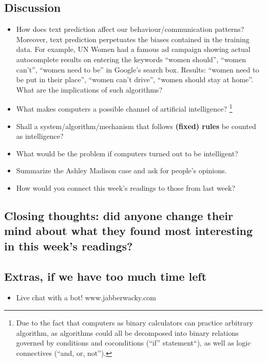 \documentclass[12pt]{article}
\theoremstyle{definition}
\theoremstyle{plain}
\begin{document}
\subsection{Discussion}
\begin{itemize}
    \item How does text prediction affect our behaviour/communication patterns? 
    Moreover, text prediction perpetuates the biases contained in the training data. For example, UN Women had a famous ad campaign showing actual autocomplete results on entering the keywords ``women should'', ``women can't'', ``women need to be'' in Google's search box. Results: ``women need to be put in their place'', ``women can't drive'', ``women should stay at home''.
    What are the implications of such algorithms?

    \item What makes computers a possible channel of artificial
        intelligence?
        \footnote{Due to the fact that computers as binary calculators can
            practice arbitrary algorithm, as algorithms could all be decomposed
            into binary relations governed by conditions and coconditions
            (``if'' statement``), as well as logic connectives (``and, or,
            not'').
        }

    \item Shall a system/algorithm/mechanism that follows \textbf{(fixed) rules}
        be counted as intelligence?

    \item What would be the problem if computers turned out to be intelligent?

    \item Summarize the Ashley Madison case and ask for people's opinions.

    \item How would you connect this week's readings to those from last week?

\end{itemize}

\subsection{Closing thoughts: did anyone change their mind about what they found most interesting in this week's readings?}

\subsection{Extras, if we have too much time left}
\begin{itemize}
  \item Live chat with a bot! www.jabberwacky.com
\end{itemize}
\end{document}
